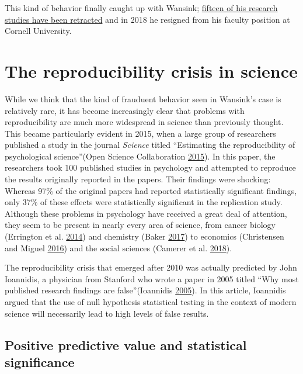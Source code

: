 \documentclass[12pt,]{book}
\theoremstyle{definition}
\theoremstyle{definition}
\theoremstyle{definition}
\theoremstyle{remark}
\begin{document}
This kind of behavior finally caught up with Wansink; \href{https://www.vox.com/science-and-health/2018/9/19/17879102/brian-wansink-cornell-food-brand-lab-retractions-jama}{fifteen of his research studies have been retracted} and in 2018 he resigned from his faculty position at Cornell University.

\hypertarget{the-reproducibility-crisis-in-science}{%
\section{The reproducibility crisis in science}\label{the-reproducibility-crisis-in-science}}

While we think that the kind of frauduent behavior seen in Wansink's case is relatively rare, it has become increasingly clear that problems with reproducibility are much more widespread in science than previously thought. This became particularly evident in 2015, when a large group of researchers published a study in the journal \emph{Science} titled ``Estimating the reproducibility of psychological science''(Open Science Collaboration \protect\hyperlink{ref-open:2015}{2015}). In this paper, the researchers took 100 published studies in psychology and attempted to reproduce the results originally reported in the papers. Their findings were shocking: Whereas 97\% of the original papers had reported statistically significant findings, only 37\% of these effects were statistically significant in the replication study. Although these problems in psychology have received a great deal of attention, they seem to be present in nearly every area of science, from cancer biology (Errington et al. \protect\hyperlink{ref-erri:iorn:gunn:2014}{2014}) and chemistry (Baker \protect\hyperlink{ref-bake:2017}{2017}) to economics (Christensen and Miguel \protect\hyperlink{ref-NBERw22989}{2016}) and the social sciences (Camerer et al. \protect\hyperlink{ref-Camerer2018EvaluatingTR}{2018}).

The reproducibility crisis that emerged after 2010 was actually predicted by John Ioannidis, a physician from Stanford who wrote a paper in 2005 titled ``Why most published research findings are false''(Ioannidis \protect\hyperlink{ref-ioan:2005}{2005}). In this article, Ioannidis argued that the use of null hypothesis statistical testing in the context of modern science will necessarily lead to high levels of false results.

\hypertarget{positive-predictive-value-and-statistical-significance}{%
\subsection{Positive predictive value and statistical significance}\label{positive-predictive-value-and-statistical-significance}}
\end{document}

